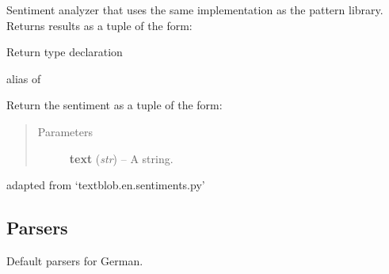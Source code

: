 \documentclass[letterpaper,10pt,english]{sphinxmanual}
\begin{document}
\begin{fulllineitems}
\label{api_reference:textblob_de.sentiments.PatternAnalyzer}
Sentiment analyzer that uses the same implementation as the
pattern library. Returns results as a tuple of the form:


\begin{fulllineitems}
\label{api_reference:textblob_de.sentiments.PatternAnalyzer.RETURN_TYPE}
Return type declaration

alias of 

\end{fulllineitems}


\begin{fulllineitems}
\label{api_reference:textblob_de.sentiments.PatternAnalyzer.analyze}
Return the sentiment as a tuple of the form:
\begin{quote}\begin{description}
\item[{Parameters}] \leavevmode
\textbf{text} (\emph{str}) -- A string.

\end{description}\end{quote}

\end{fulllineitems}


\begin{fulllineitems}
\label{api_reference:textblob_de.sentiments.PatternAnalyzer.kind}
adapted from `textblob.en.sentiments.py'

\end{fulllineitems}


\end{fulllineitems}



\subsection{Parsers}
\label{api_reference:module-textblob_de.parsers}\label{api_reference:parsers}
Default parsers for German.
\end{document}

